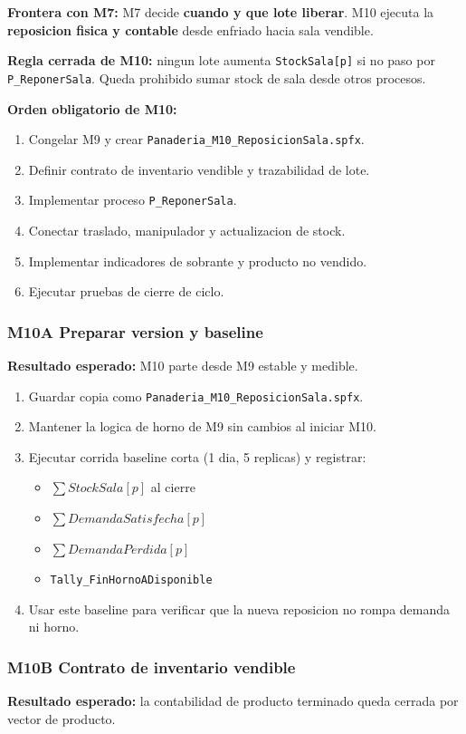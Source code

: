 \documentclass[11pt]{article}
\newcommand{\simio}[1]{\texttt{#1}}
\newcommand{\state}[1]{\texttt{#1}}
\newcommand{\proc}[1]{\texttt{#1}}
\begin{document}
\textbf{Frontera con M7:} M7 decide \textbf{cuando y que lote liberar}. M10 ejecuta la \textbf{reposicion fisica y contable} desde enfriado hacia sala vendible.

\textbf{Regla cerrada de M10:} ningun lote aumenta \state{StockSala[p]} si no paso por \proc{P\_ReponerSala}. Queda prohibido sumar stock de sala desde otros procesos.

\textbf{Orden obligatorio de M10:}
\begin{enumerate}
  \item Congelar M9 y crear \simio{Panaderia\_M10\_ReposicionSala.spfx}.
  \item Definir contrato de inventario vendible y trazabilidad de lote.
  \item Implementar proceso \proc{P\_ReponerSala}.
  \item Conectar traslado, manipulador y actualizacion de stock.
  \item Implementar indicadores de sobrante y producto no vendido.
  \item Ejecutar pruebas de cierre de ciclo.
\end{enumerate}

\subsubsection{M10A Preparar version y baseline}
\textbf{Resultado esperado:} M10 parte desde M9 estable y medible.

\begin{enumerate}
  \item Guardar copia como \simio{Panaderia\_M10\_ReposicionSala.spfx}.
  \item Mantener la logica de horno de M9 sin cambios al iniciar M10.
  \item Ejecutar corrida baseline corta (1 dia, 5 replicas) y registrar:
  \begin{itemize}
    \item \(\sum StockSala[p]\) al cierre
    \item \(\sum DemandaSatisfecha[p]\)
    \item \(\sum DemandaPerdida[p]\)
    \item \simio{Tally\_FinHornoADisponible}
  \end{itemize}
  \item Usar este baseline para verificar que la nueva reposicion no rompa demanda ni horno.
\end{enumerate}

\subsubsection{M10B Contrato de inventario vendible}
\textbf{Resultado esperado:} la contabilidad de producto terminado queda cerrada por vector de producto.
\end{document}
